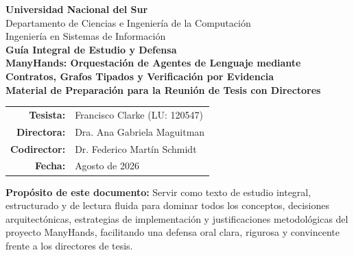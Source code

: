 \documentclass[11pt,a4paper]{article}
\begin{document}
\begin{titlepage}
  \begin{center}
    {\large\textbf{Universidad Nacional del Sur}}\\[0.2em]
    {\normalsize Departamento de Ciencias e Ingeniería de la Computación}\\[0.2em]
    {\normalsize Ingeniería en Sistemas de Información}\\[2.5em]

    {\huge\bfseries\color{primaryblue} Guía Integral de Estudio y Defensa}\\[0.8em]
    {\Large\bfseries ManyHands: Orquestación de Agentes de Lenguaje mediante Contratos, Grafos Tipados y Verificación por Evidencia}\\[2.0em]

    {\large\textbf{Material de Preparación para la Reunión de Tesis con Directores}}\\[3.0em]

    \begin{tabular}{rl}
      \textbf{Tesista:} & Francisco Clarke (LU: 120547) \\[0.6em]
      \textbf{Directora:} & Dra. Ana Gabriela Maguitman \\[0.6em]
      \textbf{Codirector:} & Dr. Federico Martín Schmidt \\[0.6em]
      \textbf{Fecha:} & Agosto de 2026
    \end{tabular}

    \vfill

    \begin{minipage}{0.9\textwidth}
      \small\color{darkgray}
      \textbf{Propósito de este documento:} Servir como texto de estudio integral, estructurado y de lectura fluida para dominar todos los conceptos, decisiones arquitectónicas, estrategias de implementación y justificaciones metodológicas del proyecto ManyHands, facilitando una defensa oral clara, rigurosa y convincente frente a los directores de tesis.
    \end{minipage}
  \end{center}
\end{titlepage}

\tableofcontents
\clearpage

\end{document}
